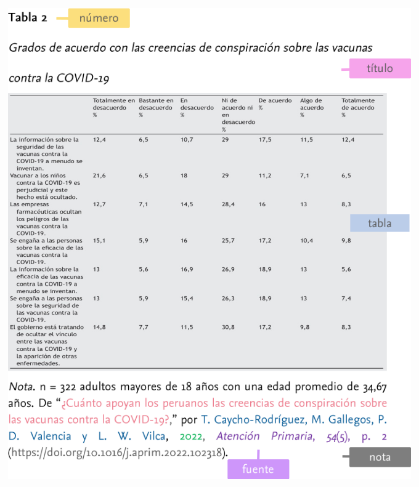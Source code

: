 \documentclass[
11pt, %
]{beamer}
\begin{document}
\begin{frame}
\begin{columns}[c]
\begin{column}{0.5\textwidth}
		\end{column}
		\begin{column}{0.5\textwidth} %
			\begin{figure}
				\centering
				\includegraphics[width=0.9\linewidth]{images/screenshot013}
			\end{figure}

		\end{column}
	\end{columns}

\end{frame}
\end{document}
